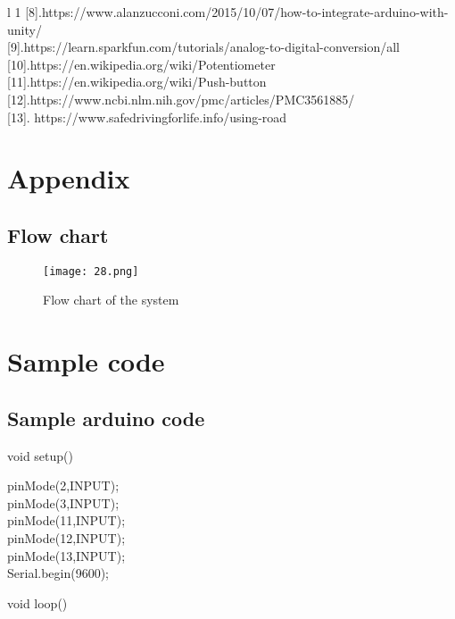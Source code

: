 \documentclass[12pt,a4paper]{article}
\begin{document}
\begin{center}
\begin{center}
\begin{center}
\begin{itemize}
\begin{tabular}{l 1}
	[8].https://www.alanzucconi.com/2015/10/07/how-to-integrate-arduino-with-unity/\\
	
	[9].https://learn.sparkfun.com/tutorials/analog-to-digital-conversion/all\\
	
	[10].https://en.wikipedia.org/wiki/Potentiometer\\
	
	[11].https://en.wikipedia.org/wiki/Push-button\\
	
	[12].https://www.ncbi.nlm.nih.gov/pmc/articles/PMC3561885/\\
	
	[13]. https://www.safedrivingforlife.info/using-road\
	
	
\end{tabular}

\newpage
\section{Appendix}
\subsection{Flow chart}
\begin{figure}[H]
	\centering 
	\texttt{[image: 28.png]}
	\caption{Flow chart of the system}	
\end{figure}
\newpage


\section*{Sample code }
\subsection{Sample arduino code}
void setup() {

pinMode(2,INPUT);\\
pinMode(3,INPUT);\\
pinMode(11,INPUT);\\
pinMode(12,INPUT);\\
pinMode(13,INPUT);\\
Serial.begin(9600);\\

}

void loop() {

}
\end{itemize}
\end{center}
\end{center}
\end{center}
\end{document}
